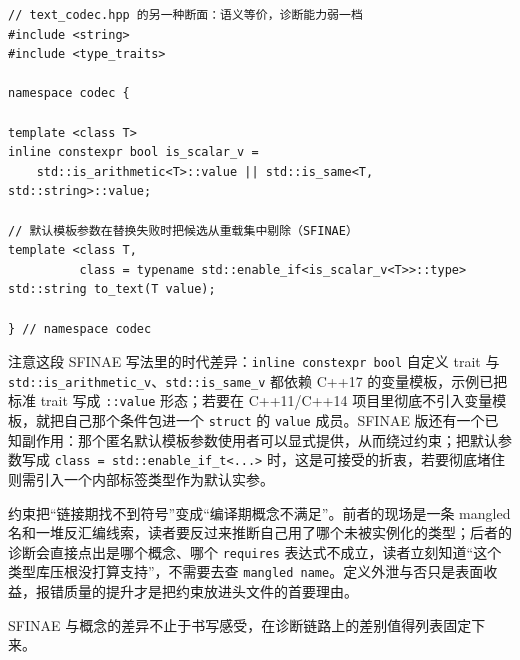 \documentclass[12pt,a4paper,fontset=fandol]{ctexbook}
\newcommand{\cpp}[1]{C++#1}
\newcommand{\kw}[1]{\texttt{#1}}
\begin{document}
\begin{lstlisting}[style=cppstyle,caption={SFINAE 版：同一件事的传统形态（本例用 C++17 语法书写 trait，退回 C++11/14 见正文）}]
// text_codec.hpp 的另一种断面：语义等价，诊断能力弱一档
#include <string>
#include <type_traits>

namespace codec {

template <class T>
inline constexpr bool is_scalar_v =
    std::is_arithmetic<T>::value || std::is_same<T, std::string>::value;

// 默认模板参数在替换失败时把候选从重载集中剔除（SFINAE）
template <class T,
          class = typename std::enable_if<is_scalar_v<T>>::type>
std::string to_text(T value);

} // namespace codec
\end{lstlisting}

注意这段 SFINAE 写法里的时代差异：\kw{inline constexpr bool} 自定义 trait 与 \kw{std::is\_arithmetic\_v}、\kw{std::is\_same\_v} 都依赖 \cpp{17} 的变量模板，示例已把标准 trait 写成 \kw{::value} 形态；若要在 \cpp{11}/\cpp{14} 项目里彻底不引入变量模板，就把自己那个条件包进一个 \kw{struct} 的 \kw{value} 成员。SFINAE 版还有一个已知副作用：那个匿名默认模板参数使用者可以显式提供，从而绕过约束；把默认参数写成 \kw{class = std::enable\_if\_t<...>} 时，这是可接受的折衷，若要彻底堵住则需引入一个内部标签类型作为默认实参。

\begin{guideline}[title={约束的真正收益是把错误前移}]
约束把“链接期找不到符号”变成“编译期概念不满足”。前者的现场是一条 mangled 名和一堆反汇编线索，读者要反过来推断自己用了哪个未被实例化的类型；后者的诊断会直接点出是哪个概念、哪个 \kw{requires} 表达式不成立，读者立刻知道“这个类型库压根没打算支持”，不需要去查 \kw{mangled name}。定义外泄与否只是表面收益，报错质量的提升才是把约束放进头文件的首要理由。
\end{guideline}

SFINAE 与概念的差异不止于书写感受，在诊断链路上的差别值得列表固定下来。
\end{document}
